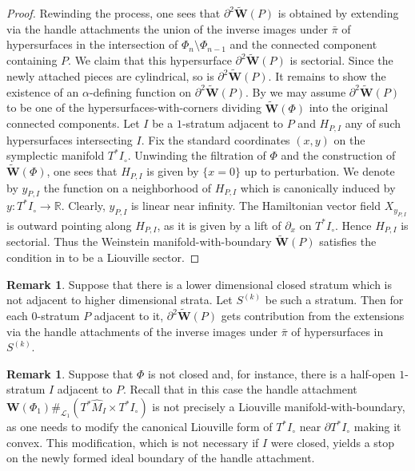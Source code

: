 \documentclass[a4paper,12pt, twoside, pdftex]{amsart}
\theoremstyle{definition}
\newtheorem{remark}[dummy]{Remark}
\numberwithin{equation}{section}
\newcommand{\del}{\partial}
\newcommand{\cL}{\mathcal{L}}
\newcommand{\bL}{\mathbb{L}}
\newcommand{\bR}{\mathbb{R}}
\newcommand{\bfW}{\mathbf{W}}
\begin{document}
\begin{proof}
Rewinding the process,
one sees that
$\del^2 \widetilde{\bfW}(P)$
is obtained by extending via the handle attachments the union of the inverse images under
$\bar{\pi}$
of hypersurfaces in the intersection of
$\Phi_n \setminus \Phi_{n-1}$
and
the connected component containing
$P$.
We claim that
this hypersurface
$\del^2 \widetilde{\bfW}(P)$
is sectorial.
Since the newly attached pieces are cylindrical,
so is
$\del^2 \widetilde{\bfW}(P)$.
It remains to show the existence of an $\alpha$-defining function on
$\del^2 \widetilde{\bfW}(P)$.  
By
\cite[Construction 12.17]{GPS2}
we may assume
$\del^2 \widetilde{\bfW}(P)$
to be one of the hypersurfaces-with-corners dividing
$\widetilde{\bfW}(\Phi)$
into the original connected components.
Let
$I$
be a $1$-stratum adjacent to
$P$
and
$H_{P, I}$
any of such hypersurfaces intersecting
$I$.
Fix the standard coordinates
$(x, y)$
on the symplectic manifold
$T^* I_\circ$.
Unwinding
the filtration of
$\Phi$
and
the construction of
$\widetilde{\bfW}(\Phi)$,
one sees that
$H_{P, I}$
is given by
$\{ x = 0 \}$
up to perturbation.
We denote by
$y_{P, I}$
the function on a neighborhood of
$H_{P, I}$
which is canonically induced by
$y \colon T^* I_\circ \to \bR$.
Clearly,
$y_{P, I}$
is linear near infinity.
The Hamiltonian vector field
$X_{y_{P, I}}$
is outward pointing along
$H_{P, I}$,
as it is given by a lift of
$\del_x$
on 
$T^* I_\circ$.
Hence
$H_{P, I}$
is sectorial.
Thus the Weinstein manifold-with-boundary
$\widetilde{\bfW}(P)$
satisfies the condition in
\cite[Definition 2.4]{GPS1}
to be a Liouville sector.
\end{proof}

\begin{remark}
Suppose that
there is a lower dimensional closed stratum
which is not adjacent to higher dimensional strata.
Let
$S^{(k)}$
be such a stratum.
Then for each $0$-stratum
$P$
adjacent to it,
$\del^2 \widetilde{\bfW}(P)$
gets contribution from the extensions via the handle attachments of the inverse images under
$\bar{\pi}$
of hypersurfaces in
$S^{(k)}$.
\end{remark}

\begin{remark}
Suppose that
$\Phi$
is not closed
and,
for instance,
there is a half-open $1$-stratum
$I$
adjacent to
$P$.
Recall that
in this case the handle attachment
$\bfW(\Phi_1) \#_{\cL_1} (T^* \widehat{M}_I \times T^* I_\circ)$
is not precisely a Liouville manifold-with-boundary,
as one needs to modify the canonical Liouville form of
$T^* I_\circ$
near
$\del T^* I_\circ$
making it convex.
This modification,
which is not necessary if
$I$
were closed,
yields a stop on the newly formed ideal boundary of the handle attachment.
\end{remark}
\end{document}
